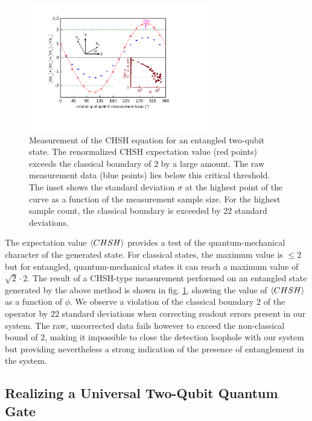 \begin{figure}[ht!]
	\centering
		\includegraphics[width=0.7\textwidth]{./material/papers/iswap/submission1/Dewes_Figure3}
	\caption[Measurement of the CHSH operator of an entanged two-qubit state]{Measurement of the CHSH equation for an entangled two-qubit state. The renormalized CHSH expectation value (red points) exceeds the classical boundary of $2$ by a large amount. The raw measurement data (blue points) lies below this critical threshold. The inset shows the standard deviation $\sigma$ at the highest point of the curve as a function of the measurement sample size. For the highest sample count, the classical boundary is exceeded by $22$ standard deviations.}
	\label{fig:chsh_measurement}
\end{figure}

The expectation value $\left< CHSH \right>$ provides a test of the quantum-mechanical character of the generated state. For classical states, the maximum value is $\le 2$ but for entangled, quantum-mechanical states it can reach a maximum value of $\sqrt{2}\cdot 2$. The result of a CHSH-type measurement performed on an entangled state generated by the above method is shown in fig. \ref{fig:chsh_measurement}, showing the value of $\left< CHSH \right>$ as a function of $\phi$. We observe a violation of the classical boundary $2$ of the operator by $22$ standard deviations when correcting readout errors present in our system. The raw, uncorrected data fails however to exceed the non-classical bound of $2$, making it impossible to close the detection loophole with our system but providing nevertheless a strong indication of the presence of entanglement in the system.

\subsection{Realizing a Universal Two-Qubit Quantum Gate}

